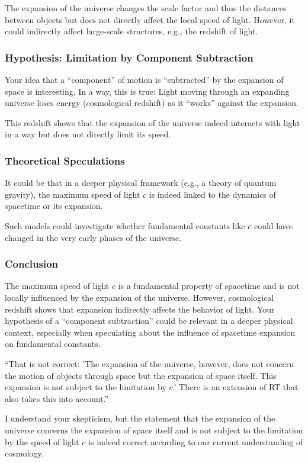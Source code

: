 \documentclass[a4paper,12pt]{article}
\begin{document}
	The expansion of the universe changes the scale factor and thus the distances between objects but does not directly affect the local speed of light. However, it could indirectly affect large-scale structures, e.g., the redshift of light.
	
	\subsubsection{Hypothesis: Limitation by Component Subtraction}
	Your idea that a ``component'' of motion is ``subtracted'' by the expansion of space is interesting. In a way, this is true: Light moving through an expanding universe loses energy (cosmological redshift) as it ``works'' against the expansion.
	
	This redshift shows that the expansion of the universe indeed interacts with light in a way but does not directly limit its speed.
	
	\subsubsection{Theoretical Speculations}
	It could be that in a deeper physical framework (e.g., a theory of quantum gravity), the maximum speed of light \( c \) is indeed linked to the dynamics of spacetime or its expansion.
	
	Such models could investigate whether fundamental constants like \( c \) could have changed in the very early phases of the universe.
	
	\subsubsection{Conclusion}
	The maximum speed of light \( c \) is a fundamental property of spacetime and is not locally influenced by the expansion of the universe. However, cosmological redshift shows that expansion indirectly affects the behavior of light. Your hypothesis of a ``component subtraction'' could be relevant in a deeper physical context, especially when speculating about the influence of spacetime expansion on fundamental constants.
	
	``That is not correct: 'The expansion of the universe, however, does not concern the motion of objects through space but the expansion of space itself. This expansion is not subject to the limitation by \( c \).' There is an extension of RT that also takes this into account.''
	
	I understand your skepticism, but the statement that the expansion of the universe concerns the expansion of space itself and is not subject to the limitation by the speed of light \( c \) is indeed correct according to our current understanding of cosmology.
	
\end{document}
